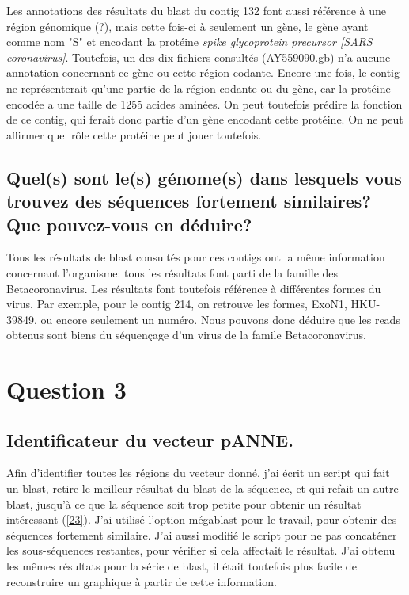 \documentclass[10.8pt]{article} %
\begin{document}
Les annotations des résultats du blast du contig 132 font aussi référence à une région génomique (?), mais cette fois-ci
à seulement un gène, le gène ayant comme nom "S" et encodant la protéine \emph{spike glycoprotein precursor [SARS coronavirus]}.
Toutefois, un des dix fichiers consultés (AY559090.gb) n'a aucune annotation concernant ce gène ou cette région codante.
Encore une fois, le contig ne représenterait qu'une partie de la région codante ou du gène, car la protéine encodée a une
taille de 1255 acides aminées. On peut toutefois prédire la fonction de ce contig, qui ferait donc partie d'un gène encodant
cette protéine. On ne peut affirmer quel rôle cette protéine peut jouer toutefois.

\subsection[Génome des séquences fortement similaires]{Quel(s) sont le(s) génome(s) dans lesquels vous trouvez des séquences
fortement similaires? Que pouvez-vous en déduire?}

Tous les résultats de blast consultés pour ces contigs ont la même information concernant l'organisme: tous les résultats
font parti de la famille des Betacoronavirus. Les résultats font toutefois référence à différentes formes du virus. Par exemple,
pour le contig 214, on retrouve les formes, ExoN1, HKU-39849, ou encore seulement un numéro. Nous pouvons donc déduire que
les reads obtenus sont biens du séquençage d'un virus de la famile Betacoronavirus.

 
\section{Question 3} %

\subsection[Identification du vecteur pANNE]{Identificateur du vecteur pANNE.}

Afin d'identifier toutes les régions du vecteur donné, j'ai écrit un script qui fait un blast, retire le
meilleur résultat du blast de la séquence, et qui refait un autre blast, jusqu'à ce que la séquence soit trop
petite pour obtenir un résultat intéressant (\ref{23}). J'ai utilisé l'option mégablast pour le travail, pour 
obtenir des séquences fortement similaire. J'ai aussi modifié le script pour ne pas concaténer les sous-séquences
restantes, pour vérifier si cela affectait le résultat. J'ai obtenu les mêmes résultats pour la série de blast,
il était toutefois plus facile de reconstruire un graphique à partir de cette information.
\end{document}
